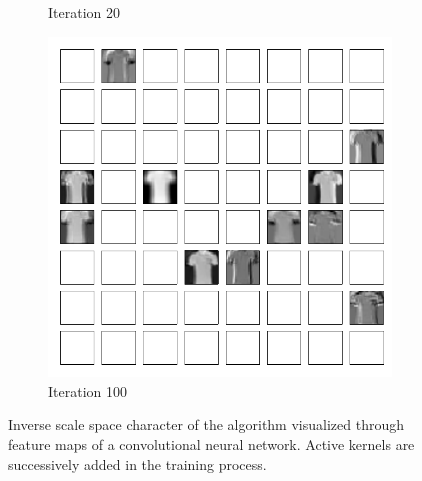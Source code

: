 {{\begin{minipage}[t]{\colwidth}
\begin{figure}[tb]
\begin{subfigure}[b]{\PicWidth}
\caption{Iteration 20}
\end{subfigure}
\hfill%
%
\begin{subfigure}[b]{\PicWidth}
\includegraphics[width=\textwidth,trim=0.35cm 0.35cm 0.2cm 0.35cm,clip]{atelier/FMNIST/FM_e100.pdf}%
\caption{Iteration 100}
\end{subfigure}
\caption{Inverse scale space character of the \LinBreg{} algorithm \cite{Bungert22} visualized through feature maps of a convolutional neural network. Active kernels are successively added in the training process.}
\label{fig:kernels}
\vspace{-10pt}
\end{figure}
%
%
%
%
\vspace{.5cm}%

\vspace{.5em}


\end{minipage}}}
